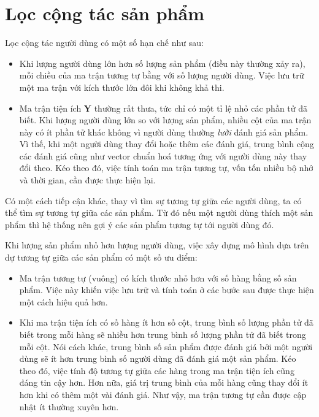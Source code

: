 \section{Lọc cộng tác sản phẩm}
\label{sec:ii}
Lọc cộng tác người dùng có một số hạn chế như sau:
\begin{itemize}
\item Khi lượng người dùng lớn hơn số lượng sản phẩm (điều này thường xảy ra), mỗi chiều của ma trận tương tự bằng với số lượng người dùng. Việc lưu trữ một ma
trận với kích thước lớn đôi khi không khả thi.

\item Ma trận tiện ích $\mathbf{Y}$ thường rất thưa, tức chỉ có
một tỉ lệ nhỏ các phần tử đã biết. Khi lượng người dùng lớn so với lượng sản phẩm, nhiều cột của ma trận này có ít phần tử khác không vì người dùng thường \textit{lười} đánh giá
sản phẩm. Vì thế, khi một người dùng thay đổi hoặc thêm các đánh giá, trung bình
cộng các
đánh giá cũng như vector chuẩn hoá tương ứng với người dùng này
thay đổi theo. Kéo theo đó, việc tính toán ma trận tương tự, vốn tốn
nhiều bộ nhớ và thời gian, cần được thực hiện lại.
\end{itemize}

Có một cách tiếp cận khác, thay vì tìm sự tương tự giữa các người dùng, ta
có thể tìm sự tương tự giữa các sản phẩm. Từ đó nếu một người dùng
thích một sản phẩm thì hệ thống nên gợi ý các sản phẩm tương tự tới
người dùng đó.

Khi lượng sản phẩm nhỏ hơn lượng người dùng, việc xây dựng mô hình dựa trên dự tương tự giữa các sản phẩm có một số ưu điểm:
\begin{itemize}
\item Ma trận tương tự (vuông) có kích thước nhỏ hơn với số hàng bằng số sản phẩm. Việc này khiến việc lưu trữ và
tính toán ở các bước sau được thực hiện một cách hiệu quả hơn.


\item Khi ma trận tiện ích có số hàng ít hơn số cột, trung bình số lượng phần tử đã
biết trong mỗi hàng sẽ nhiều hơn trung bình số lượng phần tử đã biết trong
mỗi cột. Nói cách khác, trung bình số sản phẩm được đánh giá bởi một người
dùng sẽ ít hơn trung bình số người dùng đã đánh giá một sản phẩm. Kéo theo
đó, việc tính độ
tương tự giữa các hàng trong ma trận tiện ích cũng đáng tin cậy hơn. Hơn nữa, giá trị trung bình
của mỗi hàng cũng thay đổi ít hơn khi có thêm một vài đánh giá. Như vậy,
ma trận tương tự cần được cập nhật ít thường xuyên hơn.
\end{itemize}

